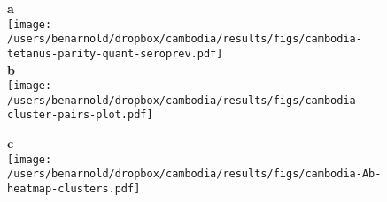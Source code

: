 \documentclass[10pt]{article}
\title{}
\author{}
\date{}
\begin{document}





\begin{figure}[htbp]
\begin{flushleft}

{\Large \textbf{a}} \\
\vspace{-10pt}
\texttt{[image: /users/benarnold/dropbox/cambodia/results/figs/cambodia-tetanus-parity-quant-seroprev.pdf]} \\

\vspace{5pt}
{\Large \textbf{b}} \\
\vspace{-25pt}
\texttt{[image: /users/benarnold/dropbox/cambodia/results/figs/cambodia-cluster-pairs-plot.pdf]} \\
\vspace{-5pt}

{\Large \textbf{c}} \\ 
\vspace{-15pt}
\texttt{[image: /users/benarnold/dropbox/cambodia/results/figs/cambodia-Ab-heatmap-clusters.pdf]} \\

\begin{minipage}{\textwidth}
\caption{}
\label{fig:tetpairsheat}
\end{minipage}
\end{flushleft}
\end{figure}
\end{document}
